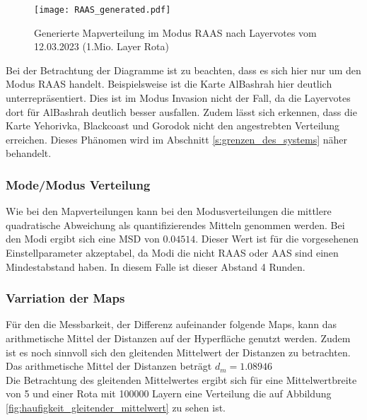             \begin{figure}[htbp]
                \centering
                \texttt{[image: RAAS\_generated.pdf]}
                \caption{Generierte Mapverteilung im Modus RAAS nach Layervotes vom 12.03.2023 (1.Mio. Layer Rota)}
                \label{fig:generated_mapverteilung_raas}
            \end{figure}

            Bei der Betrachtung der Diagramme
            ist zu beachten, dass es sich hier nur um den Modus RAAS handelt.
            Beispielsweise ist die Karte AlBashrah hier deutlich unterrepräsentiert. Dies ist im Modus Invasion
            nicht der Fall, da die Layervotes dort für AlBashrah deutlich besser ausfallen.
            Zudem lässt sich erkennen, dass die Karte Yehorivka, Blackcoast und Gorodok nicht den angestrebten
            Verteilung erreichen. Dieses Phänomen wird im Abschnitt \ref{s:grenzen_des_systems} näher behandelt.

        \subsubsection{Mode/Modus Verteilung}
            Wie bei den Mapverteilungen kann bei den Modusverteilungen die mittlere quadratische Abweichung als
            quantifizierendes Mitteln genommen werden. Bei den Modi ergibt sich eine MSD von $0.04514$.
            Dieser Wert ist für die vorgesehenen Einstellparameter akzeptabel, da Modi die nicht RAAS oder AAS sind
            einen Mindestabstand haben. In diesem Falle ist dieser Abstand 4 Runden.\\
        \subsubsection{Varriation der Maps}
            Für den die Messbarkeit, der Differenz aufeinander folgende Maps, kann das arithmetische Mittel der Distanzen
            auf der Hyperfläche genutzt werden. Zudem ist es noch sinnvoll sich den gleitenden Mittelwert der Distanzen
            zu betrachten.\\
            Das arithmetische Mittel der Distanzen beträgt $d_m = 1.08946$\\
            Die Betrachtung des gleitenden Mittelwertes ergibt sich für eine Mittelwertbreite von 5 und einer Rota mit 100000 Layern
            eine Verteilung die auf Abbildung \ref{fig:haufigkeit_gleitender_mittelwert} zu sehen ist.

